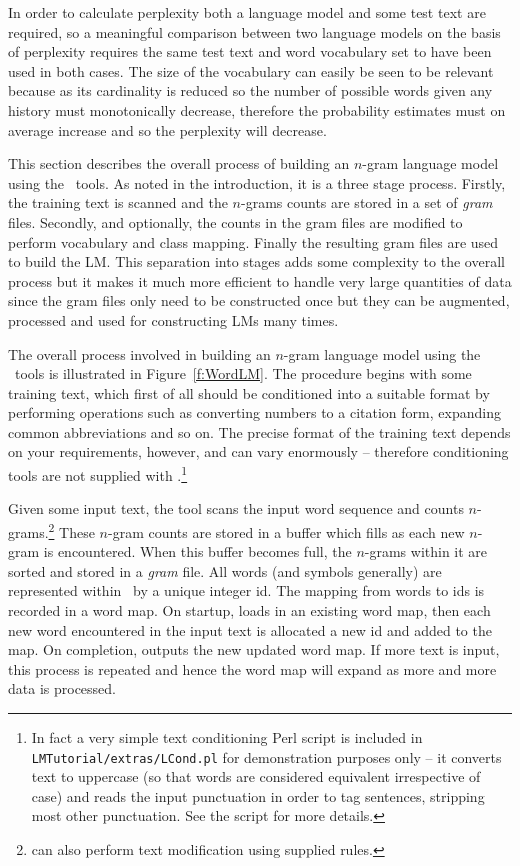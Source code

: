 In order to calculate perplexity both a language model and some test
text are required, so a meaningful comparison between two language
models on the basis of perplexity requires the same test text and word
vocabulary set to have been used in both cases. The size of the
vocabulary can easily be seen to be relevant because as its
cardinality is reduced so the number of possible words given any
history must monotonically decrease, therefore the probability
estimates must on average increase and so the perplexity will decrease.


This section describes the overall process of building an $n$-gram
language model using the \HTK\ tools.  As noted in the introduction,
it is a three stage process.  Firstly, the training text is scanned
and the $n$-grams counts are stored in a set of \textit{gram} files.
Secondly, and optionally, the counts in the gram files are modified to
perform vocabulary and class mapping.  Finally the resulting gram
files are used to build the LM. This separation into stages adds some
complexity to the overall process but it makes it much more efficient
to handle very large quantities of data since the gram files only need
to be constructed once but they can be augmented, processed and used
for constructing LMs many times.

The overall process involved in building an $n$-gram language model
using the \HTK\ tools is illustrated in Figure~\ref{f:WordLM}.  The
procedure begins with some training text, which first of all should be
conditioned into a suitable format by performing operations such as
converting numbers to a citation form, expanding common abbreviations
and so on.  The precise format of the training text depends on your
requirements, however, and can vary enormously -- therefore
conditioning tools are not supplied with \HTK.\footnote{In fact a very
simple text conditioning Perl script is included in {\tt
LMTutorial/extras/LCond.pl} for demonstration purposes only -- it
converts text to uppercase (so that words are considered equivalent
irrespective of case) and reads the input punctuation in order to tag
sentences, stripping most other punctuation.  See the script for more
details.}

Given some input text, the tool  scans the input word
sequence and counts $n$-grams.\footnote{ can also
perform text modification using supplied rules.}  These $n$-gram counts
are stored in a buffer which fills as each new $n$-gram is
encountered.  When this buffer becomes full, the $n$-grams within it
are sorted and stored in a \textit{gram} file.
All words (and symbols generally) are represented within \HTK\ by a
unique integer id.  The mapping from words to ids is recorded in a
word map.  On startup,  loads in an existing word map,
then each new word encountered in the input text is allocated a new id
and added to the map.  On completion,  outputs the new
updated word map.  If more text is input, this process is repeated and
hence the word map will expand as more and more data is processed.

